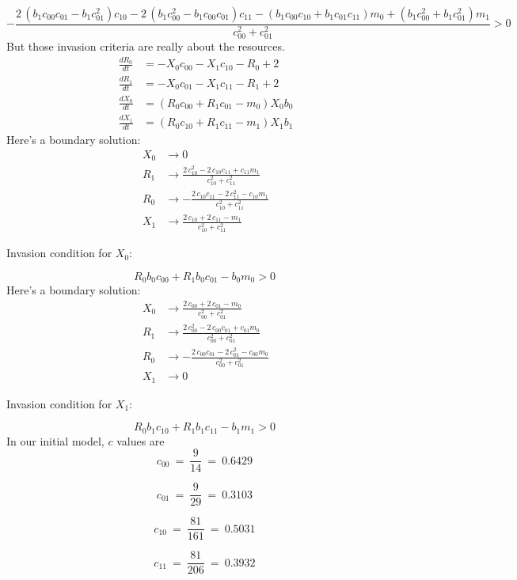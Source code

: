 \documentclass{article}
\begin{document}
\[-\frac{2 \, {\left(b_{1} c_{00} c_{01} - b_{1} c_{01}^{2}\right)} c_{10} - 2 \, {\left(b_{1} c_{00}^{2} - b_{1} c_{00} c_{01}\right)} c_{11} - {\left(b_{1} c_{00} c_{10} + b_{1} c_{01} c_{11}\right)} m_{0} + {\left(b_{1} c_{00}^{2} + b_{1} c_{01}^{2}\right)} m_{1}}{c_{00}^{2} + c_{01}^{2}} > 0 \
\]
But those invasion criteria are really about the resources.
\begin{align*}
\frac{dR_{0}}{dt} &= -X_{0} c_{00} - X_{1} c_{10} - R_{0} + 2\\
\frac{dR_{1}}{dt} &= -X_{0} c_{01} - X_{1} c_{11} - R_{1} + 2\\
\frac{dX_{0}}{dt} &= {\left(R_{0} c_{00} + R_{1} c_{01} - m_{0}\right)} X_{0} b_{0}\\
\frac{dX_{1}}{dt} &= {\left(R_{0} c_{10} + R_{1} c_{11} - m_{1}\right)} X_{1} b_{1}
\end{align*}Here's a boundary solution: \begin{align*}
  X_{0} &\to 0 \\
  R_{1} &\to \frac{2 \, c_{10}^{2} - 2 \, c_{10} c_{11} + c_{11} m_{1}}{c_{10}^{2} + c_{11}^{2}} \\
  R_{0} &\to -\frac{2 \, c_{10} c_{11} - 2 \, c_{11}^{2} - c_{10} m_{1}}{c_{10}^{2} + c_{11}^{2}} \\
  X_{1} &\to \frac{2 \, c_{10} + 2 \, c_{11} - m_{1}}{c_{10}^{2} + c_{11}^{2}}
\end{align*}

Invasion condition for $X_{0}$:

\[R_{0} b_{0} c_{00} + R_{1} b_{0} c_{01} - b_{0} m_{0} > 0 \
\]
Here's a boundary solution: \begin{align*}
  X_{0} &\to \frac{2 \, c_{00} + 2 \, c_{01} - m_{0}}{c_{00}^{2} + c_{01}^{2}} \\
  R_{1} &\to \frac{2 \, c_{00}^{2} - 2 \, c_{00} c_{01} + c_{01} m_{0}}{c_{00}^{2} + c_{01}^{2}} \\
  R_{0} &\to -\frac{2 \, c_{00} c_{01} - 2 \, c_{01}^{2} - c_{00} m_{0}}{c_{00}^{2} + c_{01}^{2}} \\
  X_{1} &\to 0
\end{align*}

Invasion condition for $X_{1}$:

\[R_{0} b_{1} c_{10} + R_{1} b_{1} c_{11} - b_{1} m_{1} > 0 \
\]
In our initial model, $c$ values are
\[c_{00} \
=\
\frac{9}{14} \
=\
0.6429 \
\]

\[c_{01} \
=\
\frac{9}{29} \
=\
0.3103 \
\]

\[c_{10} \
=\
\frac{81}{161} \
=\
0.5031 \
\]

\[c_{11} \
=\
\frac{81}{206} \
=\
0.3932 \
\]
\end{document}

